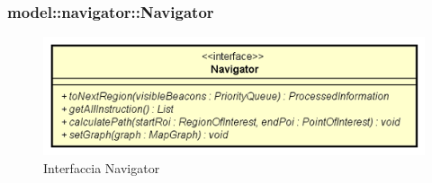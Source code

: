 \documentclass[../DefinizioneDiProdotto.tex]{subfiles}
\begin{document}
\subsubsection{model::navigator::Navigator}

    \begin{figure}[H]
        \centering
        \includegraphics{img/Navigator.png}
        \caption{Interfaccia Navigator}\label{fig:model::navigator::Navigator} 
    \end{figure}
\end{document}

